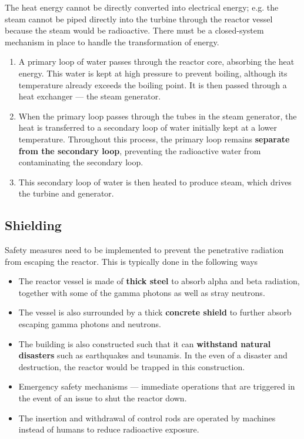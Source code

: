 \documentclass[a4paper,12pt]{article}
\begin{document}
The heat energy cannot be directly converted into electrical energy; e.g. the steam cannot be piped directly into the turbine through the reactor vessel because the steam would be radioactive. There must be a closed-system mechanism in place to handle the transformation of energy.
\begin{enumerate}
  \item A primary loop of water passes through the reactor core, absorbing the heat energy. This water is kept at high pressure to prevent boiling, although its temperature already exceeds the boiling point. It is then passed through a heat exchanger --- the steam generator.
  \item When the primary loop passes through the tubes in the steam generator, the heat is transferred to a secondary loop of water initially kept at a lower temperature. Throughout this process, the primary loop remains \textbf{separate from the secondary loop}, preventing the radioactive water from contaminating the secondary loop.
  \item This secondary loop of water is then heated to produce steam, which drives the turbine and generator.
\end{enumerate}

\pagebreak

\subsection{Shielding}

Safety measures need to be implemented to prevent the penetrative radiation from escaping the reactor. This is typically done in the following ways
\begin{itemize}
  \item The reactor vessel is made of \textbf{thick steel} to absorb alpha and beta radiation, together with some of the gamma photons as well as stray neutrons.
  \item The vessel is also surrounded by a thick \textbf{concrete shield} to further absorb escaping gamma photons and neutrons.
  \item The building is also constructed such that it can \textbf{withstand natural disasters} such as earthquakes and tsunamis. In the even of a disaster and destruction, the reactor would be trapped in this construction.
  \item Emergency safety mechanisms --- immediate operations that are triggered in the event of an issue to shut the reactor down.
  \item The insertion and withdrawal of control rods are operated by machines instead of humans to reduce radioactive exposure.
\end{itemize}
\end{document}
